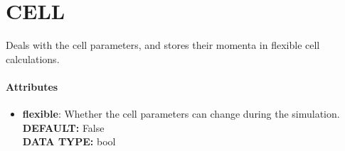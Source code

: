 \section{CELL}
\label{CELL}
Deals with the cell parameters, and stores their momenta in flexible cell calculations.
\paragraph{Attributes}
 \begin{itemize}
\item {\bf flexible}:
 Whether the cell parameters can change during the simulation.
{\\ \bf DEFAULT: }False
{\\ \bf DATA TYPE: }bool
\end{itemize}
 
